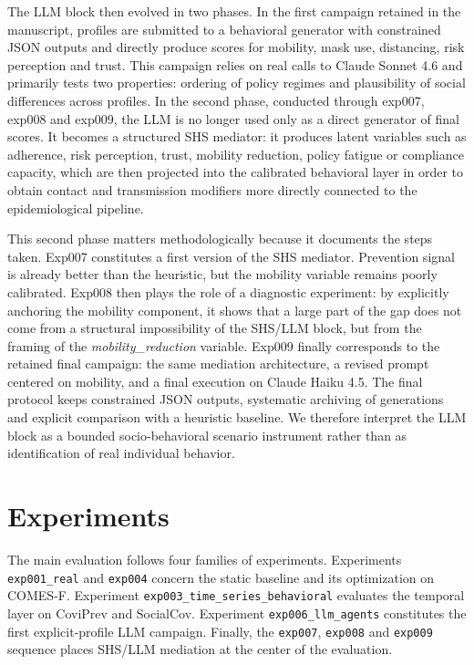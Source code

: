 \documentclass[ROIA,Unicode]{cedram}
\begin{document}
The LLM block then evolved in two phases. In the first campaign retained in the manuscript, profiles are submitted to a behavioral generator with constrained JSON outputs and directly produce scores for mobility, mask use, distancing, risk perception and trust. This campaign relies on real calls to Claude Sonnet 4.6 and primarily tests two properties: ordering of policy regimes and plausibility of social differences across profiles. In the second phase, conducted through exp007, exp008 and exp009, the LLM is no longer used only as a direct generator of final scores. It becomes a structured SHS mediator: it produces latent variables such as adherence, risk perception, trust, mobility reduction, policy fatigue or compliance capacity, which are then projected into the calibrated behavioral layer in order to obtain contact and transmission modifiers more directly connected to the epidemiological pipeline.

This second phase matters methodologically because it documents the steps taken. Exp007 constitutes a first version of the SHS mediator. Prevention signal is already better than the heuristic, but the mobility variable remains poorly calibrated. Exp008 then plays the role of a diagnostic experiment: by explicitly anchoring the mobility component, it shows that a large part of the gap does not come from a structural impossibility of the SHS/LLM block, but from the framing of the \emph{mobility\_reduction} variable. Exp009 finally corresponds to the retained final campaign: the same mediation architecture, a revised prompt centered on mobility, and a final execution on Claude Haiku 4.5. The final protocol keeps constrained JSON outputs, systematic archiving of generations and explicit comparison with a heuristic baseline. We therefore interpret the LLM block as a bounded socio-behavioral scenario instrument rather than as identification of real individual behavior.

\section{Experiments}
The main evaluation follows four families of experiments. Experiments \texttt{exp001\_real} and \texttt{exp004} concern the static baseline and its optimization on COMES-F. Experiment \texttt{exp003\_time\_series\_behavioral} evaluates the temporal layer on CoviPrev and SocialCov. Experiment \texttt{exp006\_llm\_agents} constitutes the first explicit-profile LLM campaign. Finally, the \texttt{exp007}, \texttt{exp008} and \texttt{exp009} sequence places SHS/LLM mediation at the center of the evaluation.
\end{document}

